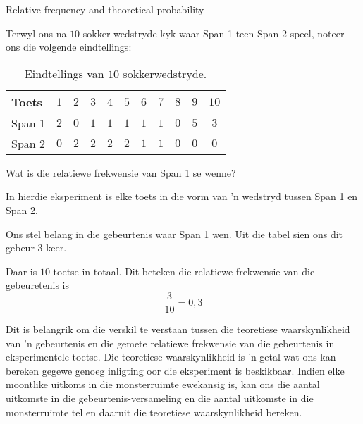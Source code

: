 
\begin{wex}{Relative frequency and theoretical probability}{
  Terwyl ons na $10$ sokker wedstryde kyk waar Span 1 teen Span 2 speel, noteer ons die volgende eindtellings:
  \begin{table}[h]
    \begin{center}
      \begin{tabular}{lcccccccccc}
        \toprule
        Toets  & $1$ & $2$ & $3$ & $4$ & $5$ & $6$ & $7$ & $8$ & $9$ & $10$ \\
        \midrule
        Span 1 & $2$ & $0$ & $1$ & $1$ & $1$ & $1$ & $1$ & $0$ & $5$ & $3$ \\
        Span 2 & $0$ & $2$ & $2$ & $2$ & $2$ & $1$ & $1$ & $0$ & $0$ & $0$ \\
        \bottomrule
      \end{tabular}
    \end{center}
    \caption{Eindtellings van $10$ sokkerwedstryde.}
  \end{table}
  Wat is die relatiewe frekwensie van Span 1 se wenne?
}{
  In hierdie eksperiment is elke toets in die vorm van 'n wedstryd tussen Span 1 en Span 2.


  Ons stel belang in die gebeurtenis waar Span 1 wen. Uit die tabel sien ons dit gebeur $3$ keer.


  Daar is $10$ toetse in totaal. Dit beteken die relatiewe frekwensie van die gebeuretenis is \[\frac{3}{10} = 0,3\]
}
\end{wex}

Dit is belangrik om die verskil te verstaan tussen die teoretiese waarskynlikheid van 'n gebeurtenis en die gemete relatiewe frekwensie van die gebeurtenis in eksperimentele toetse. Die teoretiese waarskynlikheid is 'n getal wat ons kan bereken gegewe genoeg inligting oor die eksperiment is beskikbaar. Indien elke moontlike uitkoms in die monsterruimte ewekansig is, kan ons die aantal uitkomste in die gebeurtenis-versameling en die aantal uitkomste in die monsterruimte tel en daaruit die teoretiese waarskynlikheid bereken.

